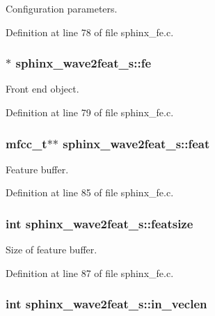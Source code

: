 Configuration parameters. 



Definition at line 78 of file sphinx\-\_\-fe.\-c.

\subsubsection[{fe}]{$\ast$ sphinx\-\_\-wave2feat\-\_\-s\-::fe}\label{structsphinx__wave2feat__s_a5882f148fe200890855304b46f00ee4b}


Front end object. 



Definition at line 79 of file sphinx\-\_\-fe.\-c.

\subsubsection[{feat}]{\setlength{\rightskip}{0pt plus 5cm}mfcc\-\_\-t$\ast$$\ast$ sphinx\-\_\-wave2feat\-\_\-s\-::feat}\label{structsphinx__wave2feat__s_ab43d8d5721133bcaf02da23c0bbb58ae}


Feature buffer. 



Definition at line 85 of file sphinx\-\_\-fe.\-c.

\subsubsection[{featsize}]{\setlength{\rightskip}{0pt plus 5cm}int sphinx\-\_\-wave2feat\-\_\-s\-::featsize}\label{structsphinx__wave2feat__s_ac041852de738a42752be67cceb16660c}


Size of feature buffer. 



Definition at line 87 of file sphinx\-\_\-fe.\-c.

\subsubsection[{in\-\_\-veclen}]{\setlength{\rightskip}{0pt plus 5cm}int sphinx\-\_\-wave2feat\-\_\-s\-::in\-\_\-veclen}\label{structsphinx__wave2feat__s_a3410a9e0c05c0057f31452550fb5380a}


